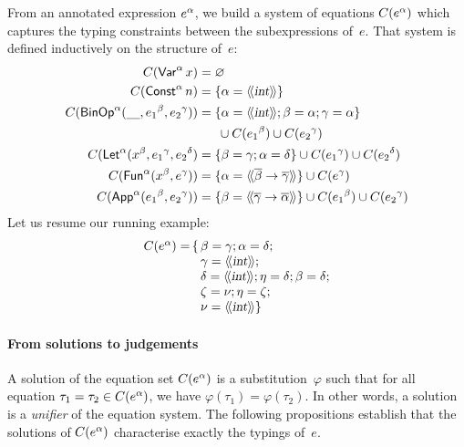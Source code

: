 From an annotated expression ${e}^{\alpha}$, we build a system of equations
$C({e}^{\alpha})$ which captures the typing constraints between the
subexpressions of~\(e\). That system is defined inductively on the
structure of~\(e\):
\begin{align*}
   C(\te{\cst{Var}}{\alpha} \, x)
&= \varnothing\\
   C(\te{\cst{Const}}{\alpha} \, n)
&= \{\alpha = \src{\type{int}}\}\\
   C(\te{\cst{BinOp}}{\alpha}(\textrm{\Large \_}, \te{e_1}{\beta},
   \te{e_2}{\gamma}))
&= \{\alpha = \src{\type{int}}; \beta = \alpha; \gamma = \alpha\}\\
&\phantom{==} \cup C(\te{e_1}{\beta}) \cup C(\te{e_2}{\gamma})\\
C(\te{\cst{Let}}{\alpha}(\te{x}{\beta}, \te{e_1}{\gamma},
  \te{e_2}{\delta}) &= 
  \{\beta = \gamma; \alpha = \delta\} \cup C(\te{e_1}{\gamma}) \cup
  C(\te{e_2}{\delta})\\
C(\te{\cst{Fun}}{\alpha} (\te{x}{\beta},\te{e}{\gamma})) &=
  \{\alpha = \src{\meta{\beta} \rightarrow \meta{\gamma}}\} \cup
  C(\te{e}{\gamma})\\
C(\te{\cst{App}}{\alpha} (\te{e_1}{\beta},\te{e_2}{\gamma})) &=
  \{\beta = \src{\meta{\gamma} \rightarrow \meta{\alpha}}\} \cup
  C(\te{e_1}{\beta}) \cup C(\te{e_2}{\gamma})
\end{align*}
Let us resume our running example:
\begin{equation*}
\begin{array}{r@{\,}r@{\,}l}
  C(\te{e}{\alpha}) = & \{ & \beta = \gamma; \alpha = \delta; \\
                      & & \gamma = \src{\type{int}}; \\
                      & & \delta = \src{\type{int}}; \eta = \delta;
                          \beta = \delta; \\
                      & & \zeta = \nu; \eta = \zeta;\\
                      & & \nu = \src{\type{int}}\}
\end{array}
\end{equation*}

\paragraph{From solutions to judgements}

A solution of the equation set $C({e}^{\alpha})$ is a
substitution~$\varphi$ such that for all equation $\tau_1 = \tau_2 \in
C({e}^{\alpha})$, we have $\varphi(\tau_1) = \varphi(\tau_2)$. In
other words, a solution is a \emph{unifier} of the equation
system. The following propositions establish that the solutions of
$C({e}^{\alpha})$ characterise exactly the typings of~\(e\).

